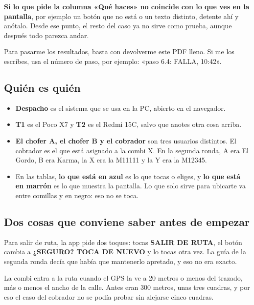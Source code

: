 \documentclass[10pt,a4paper]{article}
\newcommand{\toca}[1]{\textcolor{azul}{\textbf{#1}}}
\newcommand{\pantalla}[1]{\textcolor{marron}{\textbf{#1}}}
\begin{document}
\begin{Form}
\begin{alto}
\textbf{Si lo que pide la columna «Qué haces» no coincide con lo que ves en la pantalla}, por ejemplo un botón que no está o un texto distinto, detente ahí y anótalo. Desde ese punto, el resto del caso ya no sirve como prueba, aunque después todo parezca andar.
\end{alto}

Para pasarme los resultados, basta con devolverme este PDF lleno. Si me los escribes, usa el número de paso, por ejemplo: «paso 6.4: FALLA, 10:42».

\subsection{Quién es quién}

\begin{itemize}
  \item \textbf{Despacho} es el sistema que se usa en la PC, abierto en el navegador.
  \item \textbf{T1} es el Poco X7 y \textbf{T2} es el Redmi 15C, salvo que anotes otra cosa arriba.
  \item \textbf{El chofer A, el chofer B y el cobrador} son tres usuarios distintos. El cobrador es el que está asignado a la combi X. En la segunda ronda, A era El Gordo, B era Karma, la X era la M11111 y la Y era la M12345.
  \item En las tablas, \toca{lo que está en azul} es lo que tocas o eliges, y \pantalla{lo que está en marrón} es lo que muestra la pantalla. Lo que solo sirve para ubicarte va entre comillas y en negro: eso no se toca.
\end{itemize}

\subsection{Dos cosas que conviene saber antes de empezar}

Para salir de ruta, la app pide dos toques: tocas \toca{SALIR DE RUTA}, el botón cambia a \pantalla{¿SEGURO? TOCA DE NUEVO} y lo tocas otra vez. La guía de la segunda ronda decía que había que mantenerlo apretado, y eso no era exacto.

La combi entra a la ruta cuando el GPS la ve a 20 metros o menos del trazado, más o menos el ancho de la calle. Antes eran 300 metros, unas tres cuadras, y por eso el caso del cobrador no se podía probar sin alejarse cinco cuadras.


\end{Form}
\end{document}
